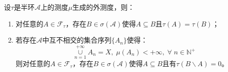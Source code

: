 \begin{theorem}\label{theo:DifOfFtauAndSigmaA}
	设$\tau$是半环$\mathscr{A}$上的测度$\mu$生成的外测度，则：
	\begin{enumerate}
		\item 对任意的$A\in\mathscr{F}_\tau$，存在$B\in\sigma(\mathscr{A})$使得$A\subseteq B$且$\tau(A)=\tau(B)$；
		\item 若存在$\mathscr{A}$中互不相交的集合序列$\{A_n\}$使得：
		\begin{equation*}
			\underset{n=1}{\overset{+\infty}{\cup}}A_n=X,\;\mu(A_n)<+\infty,\;\forall\;n\in\mathbb{N}^+
		\end{equation*}
		则对任意的$A\in\mathscr{F}_\tau$，存在$B\in\sigma(\mathscr{A})$使得$A\subseteq B$且有$\tau(B\backslash A)=0$。
	\end{enumerate}
\end{theorem}

